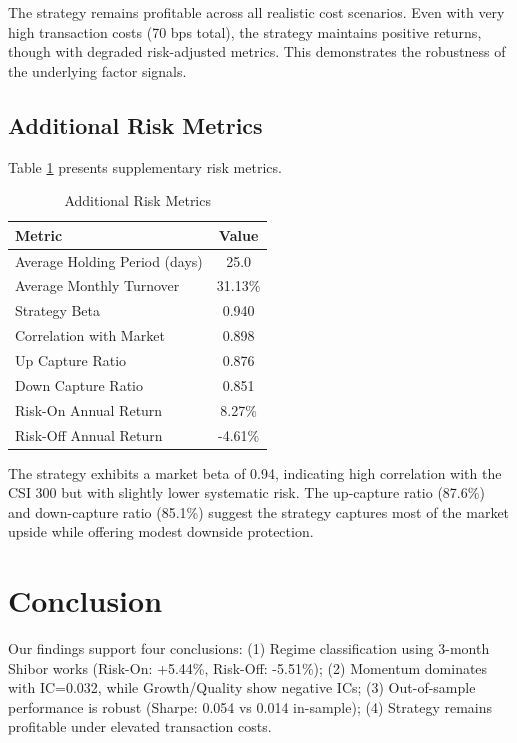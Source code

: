 \documentclass[12pt,a4paper]{article}
\begin{document}
The strategy remains profitable across all realistic cost scenarios. Even with very high transaction costs (70 bps total), the strategy maintains positive returns, though with degraded risk-adjusted metrics. This demonstrates the robustness of the underlying factor signals.

\subsection{Additional Risk Metrics}

Table \ref{tab:custom_metrics} presents supplementary risk metrics.

\begin{table}[H]
\centering
\small
\caption{Additional Risk Metrics}
\label{tab:custom_metrics}
\begin{tabular}{@{}lc@{}}
\toprule
\textbf{Metric} & \textbf{Value} \\
\midrule
Average Holding Period (days) & 25.0 \\
Average Monthly Turnover & 31.13\% \\
Strategy Beta & 0.940 \\
Correlation with Market & 0.898 \\
Up Capture Ratio & 0.876 \\
Down Capture Ratio & 0.851 \\
Risk-On Annual Return & 8.27\% \\
Risk-Off Annual Return & -4.61\% \\
\bottomrule
\end{tabular}
\end{table}

The strategy exhibits a market beta of 0.94, indicating high correlation with the CSI 300 but with slightly lower systematic risk. The up-capture ratio (87.6\%) and down-capture ratio (85.1\%) suggest the strategy captures most of the market upside while offering modest downside protection.

\section{Conclusion}

Our findings support four conclusions: (1) Regime classification using 3-month Shibor works (Risk-On: +5.44\%, Risk-Off: -5.51\%); (2) Momentum dominates with IC=0.032, while Growth/Quality show negative ICs; (3) Out-of-sample performance is robust (Sharpe: 0.054 vs 0.014 in-sample); (4) Strategy remains profitable under elevated transaction costs.
\end{document}
